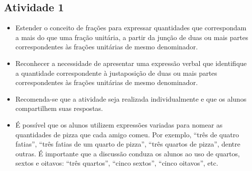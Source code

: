 \begin{multicols}{2}
  \subsection{Atividade 1}
  
   \vspace{.1cm}

  \begin{itemize} %
\item Estender o conceito de frações para expressar quantidades que correspondam a mais do que uma fração unitária, a partir da junção de duas ou mais partes correspondentes às frações unitárias de mesmo denominador.
\item Reconhecer a necessidade de apresentar uma expressão verbal que identifique a quantidade correspondente à justaposição de duas ou mais partes correspondentes às frações unitárias de mesmo denominador.
  \end{itemize} %


  \vspace{.1cm}

  \vspace{.1cm}

  \begin{itemize} %
\item Recomenda-se que a atividade seja realizada individualmente e que os alunos compartilhem suas respostas. 
\item É possível que os alunos utilizem expressões variadas para nomear as quantidades de pizza que cada amigo comeu. Por exemplo, ``três de quatro fatias'', ``três fatias de um quarto de pizza'', ``três quartos de pizza'', dentre outras. É importante que a discussão conduza os alunos ao uso de quartos, sextos e oitavos: ``três quartos'', ``cinco sextos'', ``cinco oitavos'', etc. 

\end{itemize} %

\vspace{.1cm}



\end{multicols}
